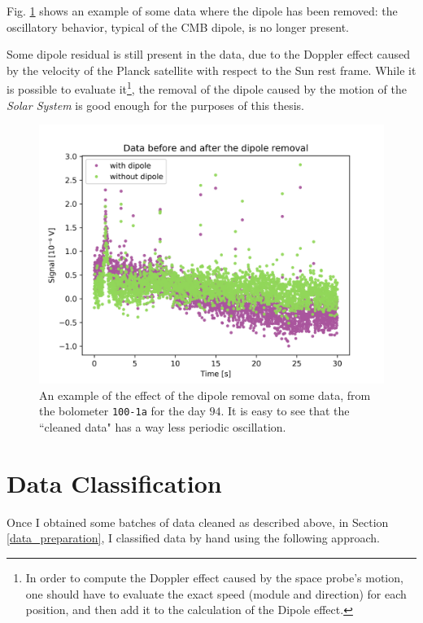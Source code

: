 \documentclass[12pt,a4paper,final]{book}			%
\begin{document}
			Fig. \ref{before_after_dipole} shows an example of some data where the dipole has been removed: the oscillatory behavior, typical of the CMB dipole, is no longer present.			
					
				Some dipole residual is still present in the data, due to the Doppler effect caused by the velocity of the Planck satellite with respect to the Sun rest frame. While it is possible to evaluate it\footnote{In order to compute the Doppler effect caused by the space probe's motion, one should have to evaluate the exact speed (module and direction) for each position, and then add it to the calculation of the Dipole effect.}, the removal of the dipole caused by the motion of the \textit{Solar System} is good enough for the purposes of this thesis. 
			 
			\begin{figure}
			\centering
			\includegraphics[scale=0.65]{figures/before_after_dipole.png}
			\caption{An example of the effect of the dipole removal on some data, from the bolometer \texttt{100-1a} for the day $94$. It is easy to see that the ``cleaned data" has a way less periodic oscillation.}
			\label{before_after_dipole}
		\end{figure}			
				
		\section{Data Classification}\label{data_classification}
		
			Once I obtained some batches of data cleaned as described above, in Section \ref{data_preparation}, I classified data by hand using the following approach.
						
\end{document}

